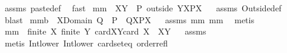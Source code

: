 \begin{isabellebody}
%
\isadelimproof
%
\endisadelimproof
%
\isatagproof
{}\isamarkupfalse%
\ assms\ paste{\isacharunderscore}def\ \isamarkupfalse%
\ fast%
\endisatagproof
{\isafoldproof}%
%
\isadelimproof
\isanewline
%
\endisadelimproof
\isanewline
{}\isamarkupfalse%
\ mm{}{}{\isacharcolon}\ \ {\isachardoublequoteopen}X{\isasyminter}Y{\isacharequal}{\isacharbraceleft}{\isacharbraceright}{\isachardoublequoteclose}\ \ {\isachardoublequoteopen}{\isacharparenleft}P\ outside\ Y{\isacharparenright}{\isacharbackquote}{\isacharbackquote}X{\isacharequal}P{\isacharbackquote}{\isacharbackquote}X{\isachardoublequoteclose}%
\isadelimproof
\ %
\endisadelimproof
%
\isatagproof
{}\isamarkupfalse%
\ assms\ Outside{\isacharunderscore}def\ \isamarkupfalse%
\ blast%
\endisatagproof
{\isafoldproof}%
%
\isadelimproof
%
\endisadelimproof
\isanewline
\isanewline
{}\isamarkupfalse%
\ mm{}{}b{\isacharcolon}\ \ {\isachardoublequoteopen}X{\isasyminter}Domain\ Q{\isacharequal}{\isacharbraceleft}{\isacharbraceright}{\isachardoublequoteclose}\ \ {\isachardoublequoteopen}{\isacharparenleft}P\ {\isacharplus}{\isacharasterisk}\ Q{\isacharparenright}{\isacharbackquote}{\isacharbackquote}X{\isacharequal}P{\isacharbackquote}{\isacharbackquote}X{\isachardoublequoteclose}%
\isadelimproof
\ %
\endisadelimproof
%
\isatagproof
{}\isamarkupfalse%
\ assms\ mm{}{}\ mm{}{}\ \isamarkupfalse%
\ metis%
\endisatagproof
{\isafoldproof}%
%
\isadelimproof
%
\endisadelimproof
\isanewline
\isanewline
{}\isamarkupfalse%
\ mm{}{}{\isacharcolon}\ \ {\isachardoublequoteopen}finite\ X{\isachardoublequoteclose}\ {\isachardoublequoteopen}finite\ Y{\isachardoublequoteclose}\ {\isachardoublequoteopen}card{\isacharparenleft}X{\isasyminter}Y{\isacharparenright}{\isacharequal}card\ X{\isachardoublequoteclose}\ \ {\isachardoublequoteopen}X{\isasymsubseteq}Y{\isachardoublequoteclose}%
\isadelimproof
\ %
\endisadelimproof
%
\isatagproof
{}\isamarkupfalse%
\ assms\ \isanewline
{}\isamarkupfalse%
\ {\isacharparenleft}metis\ Int{\isacharunderscore}lower{}\ Int{\isacharunderscore}lower{}\ card{\isacharunderscore}seteq\ order{\isacharunderscore}refl{\isacharparenright}%
\endisatagproof
{\isafoldproof}%
%
\isadelimproof
%
\endisadelimproof

\end{isabellebody}
